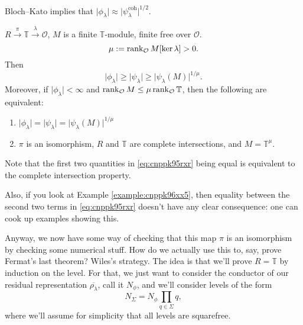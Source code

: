 \documentclass[reqno]{amsart} 
\begin{document}
Bloch--Kato implies that $\lvert \phi_\lambda \rvert \approx \lvert \psi_\lambda^{\mathrm{coh}} \rvert^{1/2}$.

\begin{theorem}
  $R \xrightarrow{\pi} \mathbb{T} \xrightarrow{\lambda} \mathcal{O}$, $M$ is a finite $\mathbb{T}$-module, finite free over $\mathcal{O}$.
  \begin{equation*}
    \mu := \operatorname{rank}_{\mathcal{O}} M[\ker \lambda] > 0.
  \end{equation*}
  Then
  \begin{equation}\label{eq:cnppk95rxr}
    \lvert \phi_\lambda \rvert \geq \lvert \psi_\lambda \rvert \geq \lvert \psi_\lambda(M) \rvert^{1/\mu}.
  \end{equation}
  Moreover, if $\lvert \phi_\lambda \rvert < \infty$ and $\operatorname{rank}_{\mathcal{O}} M \leq \mu \operatorname{rank}_{\mathcal{O}} \mathbb{T}$, then the following are equivalent:
  \begin{enumerate}
  \item\label{enumerate:cnppk94vvy} $\lvert \phi_\lambda \rvert = \lvert \psi_\lambda \rvert = \lvert \psi_\lambda(M) \rvert^{1/\mu}$
  \item\label{enumerate:cnppk94wke} $\pi$ is an isomorphism, $R$ and $\mathbb{T}$ are complete intersections, and $M = \mathbb{T}^{\mu}$.
  \end{enumerate}
\end{theorem}
Note that the first two quantities in \eqref{eq:cnppk95rxr} being equal is equivalent to the complete intersection property.

Also, if you look at Example \ref{example:cnppk96xx5}, then equality between the second two terms in \eqref{eq:cnppk95rxr} doesn't have any clear consequence: one can cook up examples showing this.

Anyway, we now have some way of checking that this map $\pi$ is an isomorphism by checking some numerical stuff.  How do we actually use this to, say, prove Fermat's last theorem?  Wiles's strategy.  The idea is that we'll prove $R = \mathbb{T}$ by induction on the level.  For that, we just want to consider the conductor of our residual representation $\overline{\rho_\lambda}$, call it $N_{\phi}$, and we'll consider levels of the form
\begin{equation*}
  N_{\Sigma} = N_{\phi} \prod_{q \in \Sigma} q,
\end{equation*}
where we'll assume for simplicity that all levels are squarefree.
\end{document}
